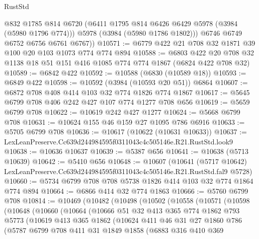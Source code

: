 \begin{lexlean}{RustStd}
\begin{coremodule}
          @832
          @1785
          @814
          @6720
          (@6411 @1795 @814 @6426 @6429 @5978 (@3984 (@5980 @1796 @774)))
          @5978
          (@3984 (@5980 @1786 @1802)))
        @6746
        @6749
        @6752
        @6756
        @6761
        @6767))
@10571 := @6779 @422 @21 @708 @32 @1871 @39 @100 @20 @103 @1073 @774 @774 @894
@10588 := @6803
    @422
    @20
    @708
    @32
    @1138
    @18
    @51
    @151
    @416
    @1085
    @774
    @774
    @1867
    (@6824 @422 @708 @32)
@10589 := @6842 @422
@10592 := @10588 (@6830 (@10589 @18))
@10593 := @6849 @422
@10598 := @10592 (@3984 (@10593 @20 @51)) @6864
@10607 := @6872 @708 @408 @414 @103 @32 @774 @1826 @774 @1867
@10617 := @5645 @6799 @708 @406 @242 @427 @107 @774 @1277 @708 @656
@10619 := @5659 @6799 @708
@10622 := @10619 @242 @427 @1277
@10624 := @5668 @6799 @708
@10631 := @10624 @155 @46 @159 @27 @1095 @786 @6916
@10633 := @5705 @6799 @708
@10636 := @10617 (@10622 (@10631 @10633))
@10637 := LexLeanPreserve.Cc639d244984595f0311043c4c505146e.R21.RustStd.look9
@10638 := @10636 @10637
@10639 := @5387 @656
@10641 := @10638 (@5713 @10639)
@10642 := @5410 @656
@10648 := @10607
    (@10641 (@5717 @10642) LexLeanPreserve.Cc639d244984595f0311043c4c505146e.R21.RustStd.fal9 @5728)
@10660 := @5734 @6799 @708 @708 @5738 @1826 @414 @103 @32 @774 @1864 @774 @894
@10664 := @6866 @414 @32 @774 @1863
@10666 := @5760 @6799 @708
@10814 := @10469
    (@10482
      (@10498
        (@10502
          (@10558
            (@10571
              (@10598
                (@10648
                  (@10660
                    (@10664
                      (@10666
                        @51
                        @32
                        @413
                        @365
                        @774
                        @1862
                        @793
                        @5773
                        (@10619
                          @413
                          @365
                          @1862
                          (@10624
                            @411
                            @46
                            @31
                            @27
                            @1860
                            @786
                            (@5787
                              @6799
                              @708
                              @411
                              @31
                              @1849
                              @1858
                              (@6883
                                @316
                                @410
                                @369

\end{coremodule}
\end{lexlean}
